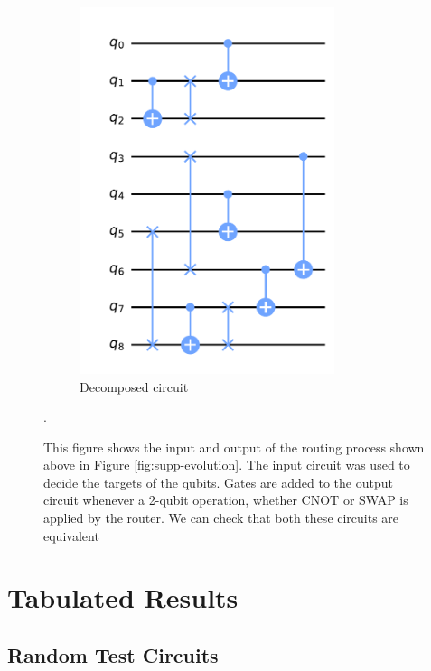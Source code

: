 \begin{figure}[ht]
\begin{subfigure}[b]{0.38\linewidth}
        \includegraphics[width=0.82\textwidth]{figures/qroute/supp_circuit_final.pdf}
        \caption{Decomposed circuit\label{fig:appendix-sliced_circ}}
    \end{subfigure}
    \hfill
    \caption{This figure shows the input and output of the routing process shown above in Figure \ref{fig:supp-evolution}. The input circuit was used to decide the targets of the qubits. Gates are added to the output circuit whenever a 2-qubit operation, whether CNOT or SWAP is applied by the router. We can check that both these circuits are equivalent}.
    \label{fig:appendix-routing-example}
\end{figure}

\newpage

\section{Tabulated Results}

\subsection{Random Test Circuits}

